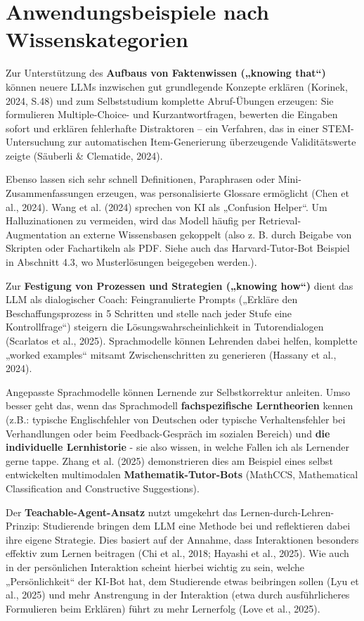 \documentclass[
  ngerman,
  letterpaper,
  DIV=11]{scrreprt}
\begin{document}
\section{Anwendungsbeispiele nach
Wissenskategorien}\label{sec-anwendungsbeispiele}

Zur Unterstützung des \textbf{Aufbaus von Faktenwissen („knowing
that``)} können neuere LLMs inzwischen gut grundlegende Konzepte
erklären (Korinek, 2024, S.48) und zum Selbststudium komplette
Abruf-Übungen erzeugen: Sie formulieren Multiple-Choice- und
Kurzantwortfragen, bewerten die Eingaben sofort und erklären fehlerhafte
Distraktoren -- ein Verfahren, das in einer STEM-Untersuchung zur
automatischen Item-Generierung überzeugende Validitätswerte zeigte
(Säuberli \& Clematide, 2024).

Ebenso lassen sich sehr schnell Definitionen, Paraphrasen oder
Mini-Zusammenfassungen erzeugen, was personalisierte Glossare ermöglicht
(Chen et al., 2024). Wang et al. (2024) sprechen von KI als „Confusion
Helper``. Um Halluzinationen zu vermeiden, wird das Modell häufig per
Retrieval-Augmentation an externe Wissensbasen gekoppelt (also z. B.
durch Beigabe von Skripten oder Fachartikeln als PDF. Siehe auch das
Harvard-Tutor-Bot Beispiel in Abschnitt 4.3, wo Musterlösungen
beigegeben werden.).

Zur \textbf{Festigung von Prozessen und Strategien („knowing how``)}
dient das LLM als dialogischer Coach: Feingranulierte Prompts („Erkläre
den Beschaffungsprozess in 5 Schritten und stelle nach jeder Stufe eine
Kontrollfrage``) steigern die Lösungswahrscheinlichkeit in
Tutorendialogen (Scarlatos et al., 2025). Sprachmodelle können Lehrenden
dabei helfen, komplette „worked examples`` mitsamt Zwischenschritten zu
generieren (Hassany et al., 2024).

Angepasste Sprachmodelle können Lernende zur Selbstkorrektur anleiten.
Umso besser geht das, wenn das Sprachmodell \textbf{fachspezifische
Lerntheorien} kennen (z.B.: typische Englischfehler von Deutschen oder
typische Verhaltensfehler bei Verhandlungen oder beim Feedback-Gespräch
im sozialen Bereich) und \textbf{die individuelle Lernhistorie} - sie
also wissen, in welche Fallen ich als Lernender gerne tappe. Zhang et
al. (2025) demonstrieren dies am Beispiel eines selbst entwickelten
multimodalen \textbf{Mathematik-Tutor-Bots} (MathCCS, Mathematical
Classification and Constructive Suggestions).

Der \textbf{Teachable-Agent-Ansatz} nutzt umgekehrt das
Lernen-durch-Lehren-Prinzip: Studierende bringen dem LLM eine Methode
bei und reflektieren dabei ihre eigene Strategie. Dies basiert auf der
Annahme, dass Interaktionen besonders effektiv zum Lernen beitragen (Chi
et al., 2018; Hayashi et al., 2025). Wie auch in der persönlichen
Interaktion scheint hierbei wichtig zu sein, welche „Persönlichkeit``
der KI-Bot hat, dem Studierende etwas beibringen sollen (Lyu et al.,
2025) und mehr Anstrengung in der Interaktion (etwa durch
ausführlicheres Formulieren beim Erklären) führt zu mehr Lernerfolg
(Love et al., 2025).
\end{document}
